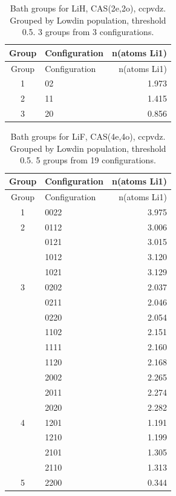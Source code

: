 
\begin{longtable}{c l r}
\caption{Bath groups for LiH, CAS(2e,2o), ccpvdz. Grouped by Lowdin population, threshold 0.5. 3 groups from 3 configurations.}\\
\hline
Group & Configuration & n(atoms Li1) \\
\hline
\endfirsthead
\hline
Group & Configuration & n(atoms Li1) \\
\hline
\endhead
1 & 02 & 1.973 \\
\hline
2 & 11 & 1.415 \\
\hline
3 & 20 & 0.856 \\
\hline
\end{longtable}

\begin{longtable}{c l r}
\caption{Bath groups for LiF, CAS(4e,4o), ccpvdz. Grouped by Lowdin population, threshold 0.5. 5 groups from 19 configurations.}\\
\hline
Group & Configuration & n(atoms Li1) \\
\hline
\endfirsthead
\hline
Group & Configuration & n(atoms Li1) \\
\hline
\endhead
1 & 0022 & 3.975 \\
\hline
2 & 0112 & 3.006 \\
 & 0121 & 3.015 \\
 & 1012 & 3.120 \\
 & 1021 & 3.129 \\
\hline
3 & 0202 & 2.037 \\
 & 0211 & 2.046 \\
 & 0220 & 2.054 \\
 & 1102 & 2.151 \\
 & 1111 & 2.160 \\
 & 1120 & 2.168 \\
 & 2002 & 2.265 \\
 & 2011 & 2.274 \\
 & 2020 & 2.282 \\
\hline
4 & 1201 & 1.191 \\
 & 1210 & 1.199 \\
 & 2101 & 1.305 \\
 & 2110 & 1.313 \\
\hline
5 & 2200 & 0.344 \\
\hline
\end{longtable}

